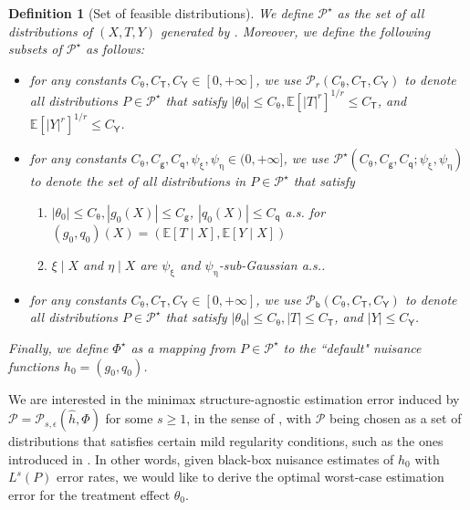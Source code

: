 \documentclass{article}
\def\eps{{\epsilon}}
\def\gP{{\mathcal{P}}}
\newcommand{\E}{\mathbb{E}}
\newtheorem{definition}{Definition}[section]
\begin{document}
\begin{definition}[Set of feasible distributions]
    \label{def:dgp}
    We define $\gP^{\star}$  as the set of all distributions of $(X,T,Y)$ generated by . Moreover, we define the following subsets of $\gP^{\star}$ as follows:
    \begin{itemize}
        \item for any constants $C_{\uptheta},C_{\mathsf{T}},C_{\mathsf{Y}} \in[0,+\infty]$, we use $\gP_{r}(C_{\uptheta},C_{\mathsf{T}},C_{\mathsf{Y}})$ to denote all distributions $P\in\gP^{\star}$ that satisfy $|\theta_0|\leq C_{\uptheta}, \E[|T|^r]^{1/r}\leq C_{\mathsf{T}}$, and $\E[|Y|^r]^{1/r}\leq C_{\mathsf{Y}}$.
        \item for any constants $C_{\uptheta},C_{\mathsf{g}},C_{\mathsf{q}}, \psi_{\upxi}, \psi_{\upeta} \in (0,+\infty]$, we use $\gP^{\star}(C_{\uptheta},C_{\mathsf{g}},C_{\mathsf{q}};\psi_{\upxi}, \psi_{\upeta})$ to denote the set of all distributions in $P\in \gP^{\star}$ that satisfy 
        \begin{enumerate}[leftmargin=0.5em]
            \item $|\theta_0|\leq C_{\uptheta}, |g_0(X)|\leq C_{\mathsf{g}}$, $|q_0(X)|\leq C_{\mathsf{q}}$ a.s. for $(g_0,q_0)(X)=(\E[T\mid X],\E[Y\mid X])$
            \item $\xi\mid X$ and $\eta\mid X$ are $\psi_{\upxi}$ and $\psi_{\upeta}$-sub-Gaussian a.s..
        \end{enumerate}
        \item for any constants $C_{\uptheta},C_{\mathsf{T}},C_{\mathsf{Y}} \in[0,+\infty]$, we use $\gP_{\mathsf{b}}(C_{\uptheta},C_{\mathsf{T}},C_{\mathsf{Y}})$ to denote all distributions $P\in\gP^{\star}$ that satisfy $|\theta_0|\leq C_{\uptheta}, |T|\leq C_{\mathsf{T}}$, and $|Y|\leq C_{\mathsf{Y}}$.
    \end{itemize}
    Finally, we define $\Phi^{\star}$ as a mapping from $P\in\gP^{\star}$ to the ``default"  nuisance functions $h_0=(g_0,q_0)$. 
\end{definition}

%

We are interested in the minimax structure-agnostic estimation error induced by $\gP = \gP_{s,\eps}(\hat{h},\Phi)$ for some $s\geq 1$, in the sense of , with $\gP$ being chosen as a set of distributions that satisfies certain mild regularity conditions, such as the ones introduced in . In other words, given black-box nuisance estimates of $h_0$ with $L^s(P)$ error rates, we would like to derive the optimal worst-case estimation error for the treatment effect $\theta_0$. 
\end{document}
